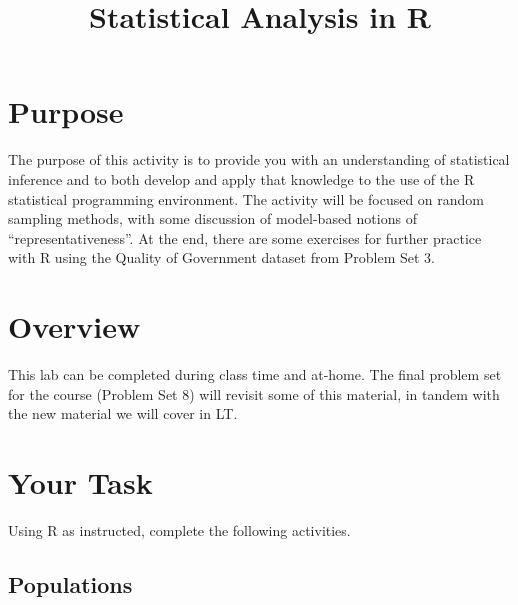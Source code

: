 \documentclass[a4paper,12pt]{article}
\title{Statistical Analysis in R}
\author{}
\date{}
\begin{document}
\vspace{-4em}

\maketitle

\vspace{-4em}

\section{Purpose}

The purpose of this activity is to provide you with an understanding of statistical inference and to both develop and apply that knowledge to the use of the R statistical programming environment. The activity will be focused on random sampling methods, with some discussion of model-based notions of ``representativeness''. At the end, there are some exercises for further practice with R using the Quality of Government dataset from Problem Set 3.

\section{Overview}

This lab can be completed during class time and at-home. The final problem set for the course (Problem Set 8) will revisit some of this material, in tandem with the new material we will cover in LT.

\section{Your Task}

Using R as instructed, complete the following activities.

\subsection{Populations}
\end{document}
